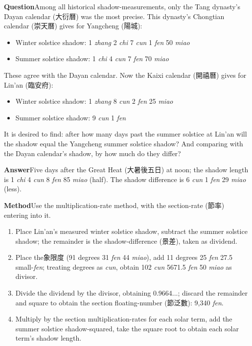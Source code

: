 \documentclass[11pt,a4paper]{article}
\newcommand{\WenEN}{\textbf{\color{headcolor}Question}}
\newcommand{\DaEN}{\textbf{\color{headcolor}Answer}}
\newcommand{\ShuEN}{\textbf{\color{headcolor}Method}}
\begin{document}
\vspace{0.5em}
\WenEN{}\quad Among all historical shadow-measurements, only the Tang dynasty's Dayan calendar (大衍曆) was the most precise. This dynasty's Chongtian calendar (崇天曆) gives for Yangcheng (陽城):
\begin{itemize}[noitemsep,topsep=0pt]
  \item Winter solstice shadow: 1 \textit{zhang} 2 \textit{chi} 7 \textit{cun} 1 \textit{fen} 50 \textit{miao}
  \item Summer solstice shadow: 1 \textit{chi} 4 \textit{cun} 7 \textit{fen} 70 \textit{miao}
\end{itemize}
These agree with the Dayan calendar. Now the Kaixi calendar (開禧曆) gives for Lin'an (臨安府):
\begin{itemize}[noitemsep,topsep=0pt]
  \item Winter solstice shadow: 1 \textit{zhang} 8 \textit{cun} 2 \textit{fen} 25 \textit{miao}
  \item Summer solstice shadow: 9 \textit{cun} 1 \textit{fen}
\end{itemize}
It is desired to find: after how many days past the summer solstice at Lin'an will the shadow equal the Yangcheng summer solstice shadow? And comparing with the Dayan calendar's shadow, by how much do they differ?

\vspace{0.5em}
\DaEN{}\quad Five days after the Great Heat (大暑後五日) at noon; the shadow length is 1 \textit{chi} 4 \textit{cun} 8 \textit{fen} 85 \textit{miao} (half). The shadow difference is 6 \textit{cun} 1 \textit{fen} 29 \textit{miao} (less).

\vspace{0.5em}
\ShuEN{}\quad Use the multiplication-rate method, with the section-rate (節率) entering into it.
\begin{enumerate}[noitemsep,topsep=0pt]
  \item Place Lin'an's measured winter solstice shadow, subtract the summer solstice shadow; the remainder is the shadow-difference (景差), taken as dividend.
  \item Place the象限度 (91 degrees 31 \textit{fen} 44 \textit{miao}), add 11 degrees 25 \textit{fen} 27.5 small-\textit{fen}; treating degrees as \textit{cun}, obtain 102 \textit{cun} 5671.5 \textit{fen} 50 \textit{miao} as divisor.
  \item Divide the dividend by the divisor, obtaining 0.9664...; discard the remainder and square to obtain the section floating-number (節泛數): 9,340 \textit{fen}.
  \item Multiply by the section multiplication-rates for each solar term, add the summer solstice shadow-squared, take the square root to obtain each solar term's shadow length.
\end{enumerate}
\end{document}
